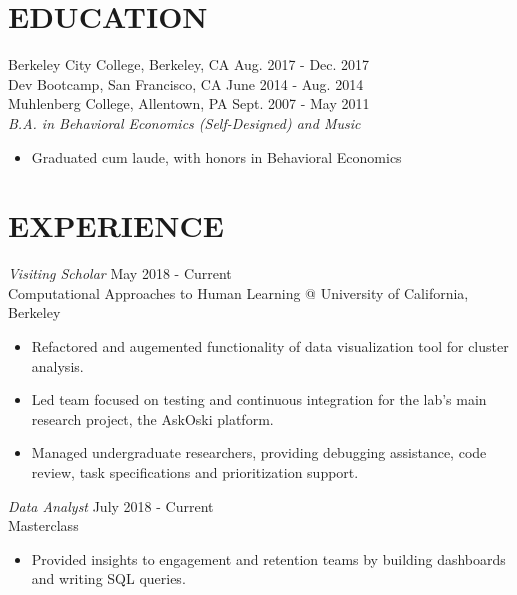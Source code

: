 \documentclass[margin, 10pt]{res} %
\begin{document}
\begin{resume}


\section{\small\bf EDUCATION}
Berkeley City College, Berkeley, CA \hfill Aug. 2017 - Dec. 2017 \\
Dev Bootcamp, San Francisco, CA \hfill June 2014 - Aug. 2014 \\
Muhlenberg College, Allentown, PA \hfill Sept. 2007 - May 2011 \\
{\sl B.A. in Behavioral Economics (Self-Designed) and Music}
\begin{itemize} \itemsep -2pt %
\item Graduated cum laude, with honors in Behavioral Economics
\end{itemize}



\section{\small\bf EXPERIENCE}

{\sl Visiting Scholar} \hfill May 2018 - Current \\
Computational Approaches to Human Learning @ University of California, Berkeley
\begin{itemize} \itemsep -2pt %
\item Refactored and augemented functionality of data visualization tool for cluster analysis.
\item Led team focused on testing and continuous integration for the lab's main research project, the AskOski platform.
\item Managed undergraduate researchers, providing debugging assistance, code review, task specifications and prioritization support.
\end{itemize}

{\sl Data Analyst} \hfill July 2018 - Current \\
Masterclass
\begin{itemize} \itemsep -2pt %
\item Provided insights to engagement and retention teams by building dashboards and writing SQL queries.
\end{itemize}


\end{resume}
\end{document}
